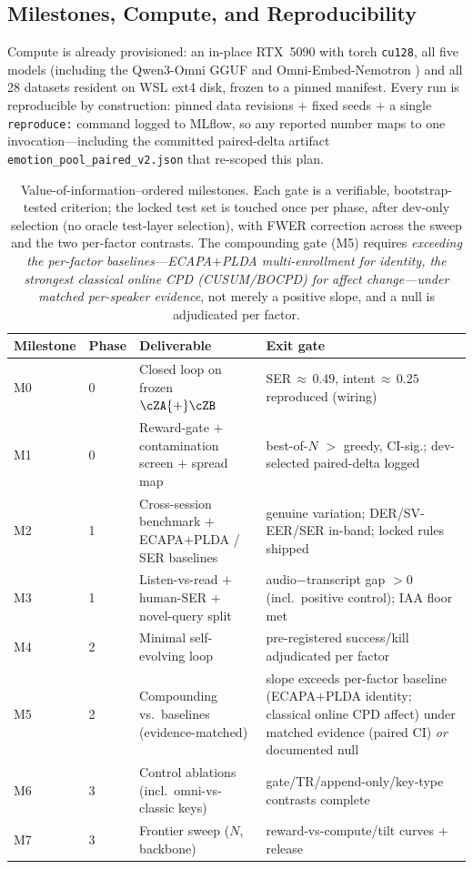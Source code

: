 \subsection{Milestones, Compute, and Reproducibility}
\label{sub:milestones}

Compute is already provisioned: an in-place RTX~5090 with torch \texttt{cu128}, all five models (including the Qwen3-Omni GGUF and Omni-Embed-Nemotron \citealp{omniembedweights}) and all 28 datasets resident on WSL ext4 disk, frozen to a pinned manifest. Every run is reproducible by construction: pinned data revisions $+$ fixed seeds $+$ a single \texttt{reproduce:} command logged to MLflow, so any reported number maps to one invocation---including the committed paired-delta artifact \texttt{emotion\_pool\_paired\_v2.json} that re-scoped this plan.

\begin{table}[t]
\centering
\small
\begin{tabular}{llll}
\hline
\textbf{Milestone} & \textbf{Phase} & \textbf{Deliverable} & \textbf{Exit gate} \\
\hline
M0 & 0 & Closed loop on frozen $\cZA{+}\cZB$ & SER$\,{\approx}\,0.49$, intent$\,{\approx}\,0.25$ reproduced (wiring) \\
M1 & 0 & Reward-gate $+$ contamination screen $+$ spread map & best-of-$N$ $>$ greedy, CI-sig.; dev-selected paired-delta logged \\
M2 & 1 & Cross-session benchmark $+$ ECAPA$+$PLDA / SER baselines & genuine variation; DER/SV-EER/SER in-band; locked rules shipped \\
M3 & 1 & Listen-vs-read $+$ human-SER $+$ novel-query split & audio$-$transcript gap $>0$ (incl.\ positive control); IAA floor met \\
M4 & 2 & Minimal self-evolving loop & pre-registered success/kill adjudicated per factor \\
M5 & 2 & Compounding vs.\ baselines (evidence-matched) & slope exceeds per-factor baseline (ECAPA$+$PLDA identity; classical online CPD affect) under matched evidence (paired CI) \emph{or} documented null \\
M6 & 3 & Control ablations (incl.\ omni-vs-classic keys) & gate/TR/append-only/key-type contrasts complete \\
M7 & 3 & Frontier sweep ($N$, backbone) & reward-vs-compute/tilt curves $+$ release \\
\hline
\end{tabular}
\caption{Value-of-information--ordered milestones. Each gate is a verifiable, bootstrap-tested criterion; the locked test set is touched once per phase, after dev-only selection (no oracle test-layer selection), with FWER correction across the sweep and the two per-factor contrasts. The compounding gate (M5) requires \emph{exceeding the per-factor baselines---ECAPA$+$PLDA multi-enrollment for identity, the strongest classical online CPD (CUSUM/BOCPD) for affect change---under matched per-speaker evidence}, not merely a positive slope, and a null is adjudicated per factor.}
\label{tab:milestones}
\end{table}

